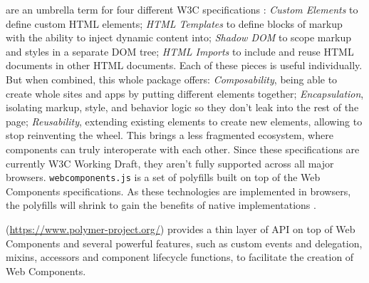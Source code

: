 \begin{description}
\itemsep1pt\parskip0pt

\item[Web Components] are an umbrella term for four different W3C specifications \cite{w3c}:
\emph{Custom Elements} to define custom HTML elements;
\emph{HTML Templates} to define blocks of markup with the ability to inject dynamic content into;
\emph{Shadow DOM} to scope markup and styles in a separate DOM tree;
\emph{HTML Imports} to include and reuse HTML documents in other HTML documents.
Each of these pieces is useful individually. But when combined, this whole package offers:
\emph{Composability}, being able to create whole sites and apps by putting different elements together;
\emph{Encapsulation}, isolating markup, style, and behavior logic so they don’t leak into the rest of the page;
\emph{Reusability}, extending existing elements to create new elements, allowing to stop reinventing the wheel.
This brings a less fragmented ecosystem, where components can truly interoperate with each other.
Since these specifications are currently W3C Working Draft, they aren’t fully supported across all major browsers. \texttt{webcomponents.js} is a set of polyfills built on top of the Web Components specifications. 
As these technologies are implemented in browsers, the polyfills will shrink to gain the benefits of native implementations \cite{webcomponents-polyfills}. 
        
\item[Polymer library] (\url{https://www.polymer-project.org/}) provides a thin layer of API on top of Web Components and several powerful features, such as custom events and delegation, mixins, accessors and component lifecycle functions, to facilitate the creation of Web Components. 
\end{description}


 
